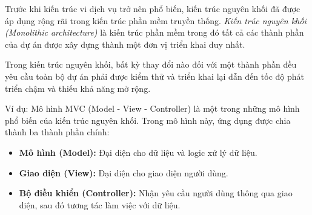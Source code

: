 Trước khi kiến trúc vi dịch vụ trở nên phổ biến, kiến trúc nguyên khối đã được áp dụng rộng rãi trong kiến trúc phần mềm truyền thống. \emph{Kiến trúc nguyên khối (Monolithic architecture)} là kiến trúc phần mềm trong đó tất cả các thành phần của dự án được xây dựng thành một đơn vị triển khai duy nhất.

Trong kiến trúc nguyên khối, bất kỳ thay đổi nào đối với một thành phần đều yêu cầu toàn bộ dự án phải được kiểm thử và triển khai lại dẫn đến tốc độ phát triển chậm và thiếu khả năng mở rộng.

Ví dụ: Mô hình MVC (Model - View - Controller) là một trong những mô hình phổ biến của kiến trúc nguyên khối. Trong mô hình này, ứng dụng được chia thành ba thành phần chính:

\begin{itemize}

\item \textbf{Mô hình (Model):} Đại diện cho dữ liệu và logic xử lý dữ liệu.

\item \textbf{Giao diện (View):} Đại diện cho giao diện người dùng.

\item \textbf{Bộ điều khiển (Controller):} Nhận yêu cầu người dùng thông qua giao diện, sau đó tương tác làm việc với dữ liệu.

\end{itemize}